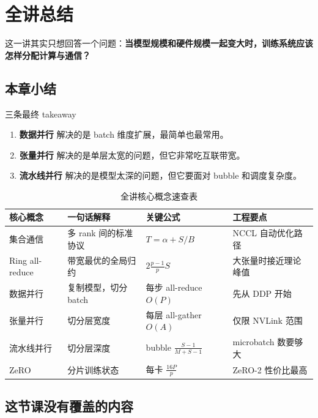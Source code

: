 \section{全讲总结}

这一讲其实只想回答一个问题：\textbf{当模型规模和硬件规模一起变大时，训练系统应该怎样分配计算与通信？}

\subsection{本章小结}

\begin{importantbox}{三条最终 takeaway}
\begin{enumerate}
    \item \textbf{数据并行} 解决的是 batch 维度扩展，最简单也最常用。
    \item \textbf{张量并行} 解决的是单层太宽的问题，但它非常吃互联带宽。
    \item \textbf{流水线并行} 解决的是模型太深的问题，但它要面对 bubble 和调度复杂度。
\end{enumerate}
\end{importantbox}

\begin{table}[H]
\centering
\small
\begin{tabular}{p{3.0cm}p{3.5cm}p{3.0cm}p{3.5cm}}
\toprule
\textbf{核心概念} & \textbf{一句话解释} & \textbf{关键公式} & \textbf{工程要点} \\
\midrule
集合通信 & 多 rank 间的标准协议 & $T = \alpha + S/B$ & NCCL 自动优化路径 \\
Ring all-reduce & 带宽最优的全局归约 & $2\frac{p-1}{p}S$ & 大张量时接近理论峰值 \\
数据并行 & 复制模型，切分 batch & 每步 all-reduce $O(P)$ & 先从 DDP 开始 \\
张量并行 & 切分层宽度 & 每层 all-gather $O(A)$ & 仅限 NVLink 范围 \\
流水线并行 & 切分层深度 & bubble $\frac{S-1}{M+S-1}$ & microbatch 数要够大 \\
ZeRO & 分片训练状态 & 每卡 $\frac{16P}{p}$ & ZeRO-2 性价比最高 \\
\bottomrule
\end{tabular}
\caption{全讲核心概念速查表}
\end{table}

\subsection{这节课没有覆盖的内容}

